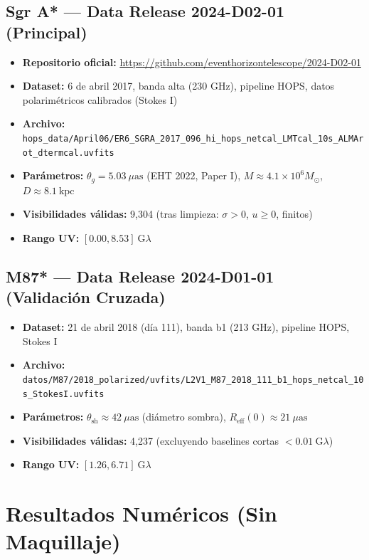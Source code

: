 \documentclass[12pt,a4paper]{article}
\begin{document}
\subsection{Sgr A* — Data Release 2024-D02-01 (Principal)}

\begin{itemize}
    \item \textbf{Repositorio oficial:} \url{https://github.com/eventhorizontelescope/2024-D02-01}
    \item \textbf{Dataset:} 6 de abril 2017, banda alta (230 GHz), pipeline HOPS, datos polarimétricos calibrados (Stokes I)
    \item \textbf{Archivo:} \texttt{hops\_data/April06/ER6\_SGRA\_2017\_096\_hi\_hops\_netcal\_LMTcal\_10s\_ALMArot\_dtermcal.uvfits}
    \item \textbf{Parámetros:} $\theta_g = 5.03 \ \mu\text{as}$ (EHT 2022, Paper I), $M \approx 4.1\times10^6 M_\odot$, $D \approx 8.1 \ \text{kpc}$
    \item \textbf{Visibilidades válidas:} 9,304 (tras limpieza: $\sigma>0$, $u\geq0$, finitos)
    \item \textbf{Rango UV:} $[0.00, 8.53] \ \text{G}\lambda$
\end{itemize}

\subsection{M87* — Data Release 2024-D01-01 (Validación Cruzada)}

\begin{itemize}
    \item \textbf{Dataset:} 21 de abril 2018 (día 111), banda b1 (213 GHz), pipeline HOPS, Stokes I
    \item \textbf{Archivo:} \texttt{datos/M87/2018\_polarized/uvfits/L2V1\_M87\_2018\_111\_b1\_hops\_netcal\_10s\_StokesI.uvfits}
    \item \textbf{Parámetros:} $\theta_{\text{sh}} \approx 42 \ \mu\text{as}$ (diámetro sombra), $R_{\text{eff}}(0) \approx 21 \ \mu\text{as}$
    \item \textbf{Visibilidades válidas:} 4,237 (excluyendo baselines cortas $<0.01 \ \text{G}\lambda$)
    \item \textbf{Rango UV:} $[1.26, 6.71] \ \text{G}\lambda$
\end{itemize}

\section{Resultados Numéricos (Sin Maquillaje)}
\end{document}
